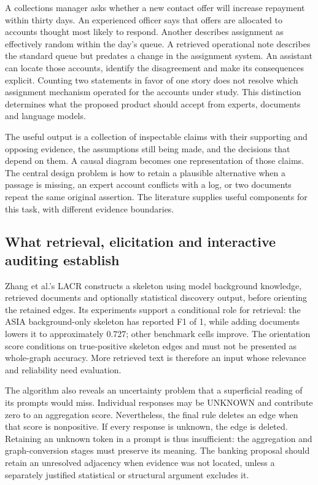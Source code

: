 \label{exec14:expert-evidence}

A collections manager asks whether a new contact offer will increase
repayment within thirty days. An experienced officer says that offers
are allocated to accounts thought most likely to respond. Another
describes assignment as effectively random within the day's queue. A
retrieved operational note describes the standard queue but predates a
change in the assignment system. An assistant can locate those accounts,
identify the disagreement and make its consequences explicit. Counting
two statements in favor of one story does not resolve which assignment
mechanism operated for the accounts under study. This distinction
determines what the proposed product should accept from experts,
documents and language models.

The useful output is a collection of inspectable claims with their
supporting and opposing evidence, the assumptions still being made, and
the decisions that depend on them. A causal diagram becomes one
representation of those claims. The central design problem is how to
retain a plausible alternative when a passage is missing, an expert
account conflicts with a log, or two documents repeat the same original
assertion. The literature supplies useful components for this task, with
different evidence boundaries.

\hypertarget{what-retrieval-elicitation-and-interactive-auditing-establish}{%
\subsection{What retrieval, elicitation and interactive auditing
establish}\label{what-retrieval-elicitation-and-interactive-auditing-establish}}

Zhang et al.'s LACR constructs a skeleton using model background
knowledge, retrieved documents and optionally statistical discovery
output, before orienting the retained edges. Its experiments support a
conditional role for retrieval: the ASIA background-only skeleton has
reported F1 of 1, while adding documents lowers it to approximately
0.727; other benchmark cells improve. The orientation score conditions
on true-positive skeleton edges and must not be presented as whole-graph
accuracy. More retrieved text is therefore an input whose relevance and
reliability need evaluation. \citep{v12_la_2402_15301}

The algorithm also reveals an uncertainty problem that a superficial
reading of its prompts would miss. Individual responses may be UNKNOWN
and contribute zero to an aggregation score. Nevertheless, the final
rule deletes an edge when that score is nonpositive. If every response
is unknown, the edge is deleted. Retaining an unknown token in a prompt
is thus insufficient: the aggregation and graph-conversion stages must
preserve its meaning. The banking proposal should retain an unresolved
adjacency when evidence was not located, unless a separately justified
statistical or structural argument excludes it.
\citep{v12_la_2402_15301}

